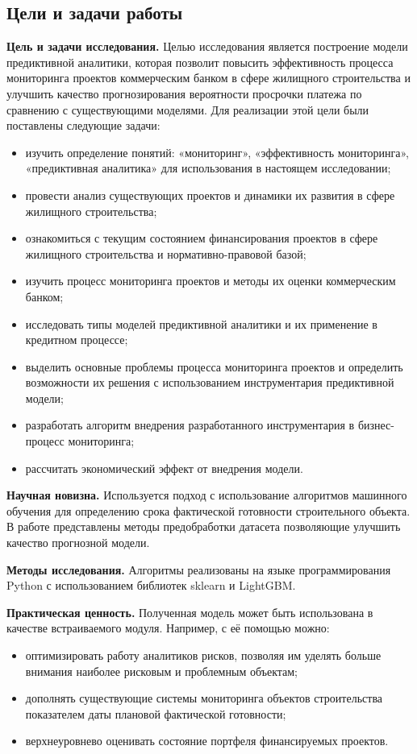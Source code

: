 \documentclass[12pt,a4paper]{article} %
\begin{document}
\newpage
\subsection{Цели и задачи работы}

\textbf{Цель и задачи исследования.} Целью исследования является построение модели предиктивной аналитики, которая позволит повысить эффективность процесса мониторинга проектов коммерческим банком в сфере жилищного строительства и улучшить качество прогнозирования вероятности просрочки платежа по сравнению с существующими моделями. Для реализации этой цели были поставлены следующие задачи:
\begin{itemize}
	\item изучить определение понятий: «мониторинг», «эффективность мониторинга», «предиктивная аналитика» для использования в настоящем исследовании;
	\item провести анализ существующих проектов и динамики их развития в сфере жилищного строительства;
	\item ознакомиться с текущим состоянием финансирования проектов в сфере жилищного строительства и нормативно-правовой базой;
	\item изучить процесс мониторинга проектов и методы их оценки коммерческим банком;
	\item исследовать типы моделей предиктивной аналитики и их применение в кредитном процессе;
	\item выделить основные проблемы процесса мониторинга проектов и определить возможности их решения с использованием инструментария предиктивной модели; 
	\item разработать алгоритм внедрения разработанного инструментария в бизнес-процесс мониторинга;
	\item рассчитать экономический эффект от внедрения модели.
\end{itemize}

\bigskip

\textbf{Научная новизна.} Используется подход с использование алгоритмов машинного обучения для определению срока фактической готовности строительного объекта. В работе представлены методы предобработки датасета позволяющие улучшить качество прогнозной модели.

\bigskip

\textbf{Методы исследования.} Алгоритмы реализованы на языке программирования Python с использованием библиотек sklearn и LightGBM.

\bigskip

\textbf{Практическая ценность.} Полученная модель может быть использована в качестве встраиваемого модуля. Например, с её помощью можно:
\begin{itemize}
	\item оптимизировать работу аналитиков рисков, позволяя им уделять больше внимания наиболее рисковым и проблемным объектам;
	\item дополнять существующие системы мониторинга объектов строительства показателем даты плановой фактической готовности;
	\item верхнеуровнево оценивать состояние портфеля финансируемых проектов.
\end{itemize}
\end{document}
